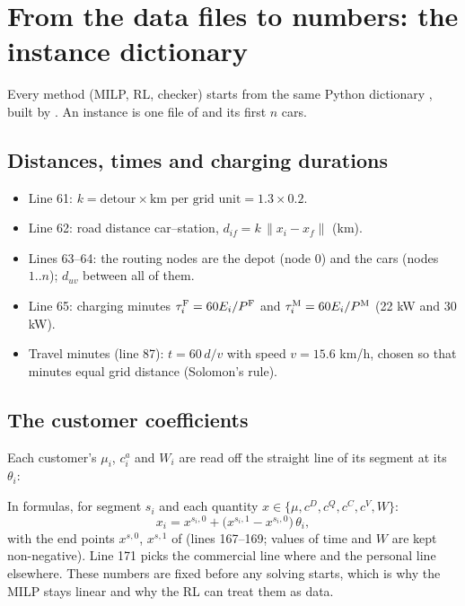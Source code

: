 \section{From the data files to numbers: the instance dictionary}
\label{sec:data}

Every method (MILP, RL, checker) starts from the same Python dictionary , built by . An instance is one file of  and its first $n$ cars.

\subsection{Distances, times and charging durations}


\begin{itemize}
  \item Line 61: $k=\text{detour}\times\text{km per grid unit}=1.3\times0.2$.
  \item Line 62: road distance car--station, $d_{if}=k\,\lVert x_i-x_f\rVert$ (km).
  \item Lines 63--64: the routing nodes are the depot (node 0) and the cars (nodes $1..n$); $d_{uv}$ between all of them.
  \item Line 65: charging minutes $\tau^{\mathrm{F}}_i=60E_i/P^{\mathrm{F}}$ and $\tau^{\mathrm{M}}_i=60E_i/P^{\mathrm{M}}$ (22 kW and 30 kW).
  \item Travel minutes (line 87): $t=60\,d/v$ with speed $v=15.6$ km/h, chosen so that minutes equal grid distance (Solomon's rule).
\end{itemize}

\subsection{The customer coefficients}

Each customer's $\mu_i$, $c^a_i$ and $W_i$ are read off the straight line of its segment at its $\theta_i$:


In formulas, for segment $s_i$ and each quantity $x\in\{\mu,c^D,c^Q,c^C,c^V,W\}$:
\[
x_i=x^{s_i,0}+\big(x^{s_i,1}-x^{s_i,0}\big)\,\theta_i ,
\]
with the end points $x^{s,0}$, $x^{s,1}$ of  (lines 167--169; values of time and $W$ are kept non-negative). Line 171 picks the commercial line where  and the personal line elsewhere. These numbers are fixed before any solving starts, which is why the MILP stays linear and why the RL can treat them as data.

